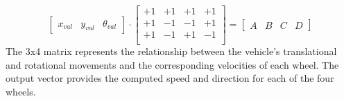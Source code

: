 \begin{equation}
	\label{eq:mecanumtranslation}
	\begin{bmatrix}
		x_{val} & y_{val} & \theta_{val}
	\end{bmatrix}
	\cdot
	\begin{bmatrix}
		+1 & +1 & +1 & +1\\
		+1 & -1 & -1 & +1\\
		+1 & -1 & +1 & -1\\
	\end{bmatrix}
	=
	\begin{bmatrix}
		A & B & C & D
	\end{bmatrix}
\end{equation}
The 3x4 matrix represents the relationship between the vehicle's translational and rotational movements and the corresponding velocities of each wheel. The output vector provides the computed speed and direction for each of the four wheels.




